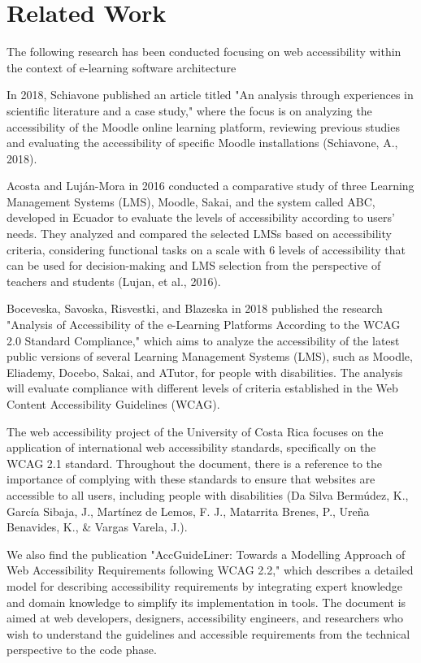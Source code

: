 \documentclass{IEEEtran}
\begin{document}
\section{Related Work}
The following research has been conducted focusing on web accessibility within the context of e-learning software architecture

In 2018, \cite{Schiavone2018}Schiavone published an article titled "An analysis through experiences in scientific literature and a case study," where the focus is on analyzing the accessibility of the Moodle online learning platform, reviewing previous studies and evaluating the accessibility of specific Moodle installations (Schiavone, A., 2018).

\cite{Acosta2016}Acosta and Luján-Mora in 2016 conducted a comparative study of three Learning Management Systems (LMS), Moodle, Sakai, and the system called ABC, developed in Ecuador to evaluate the levels of accessibility according to users' needs. They analyzed and compared the selected LMSs based on accessibility criteria, considering functional tasks on a scale with 6 levels of accessibility that can be used for decision-making and LMS selection from the perspective of teachers and students (Lujan, et al., 2016).

\cite{Bocevska2018}Boceveska, Savoska, Risvestki, and Blazeska in 2018 published the research "Analysis of Accessibility of the e-Learning Platforms According to the WCAG 2.0 Standard Compliance," which aims to analyze the accessibility of the latest public versions of several Learning Management Systems (LMS), such as Moodle, Eliademy, Docebo, Sakai, and ATutor, for people with disabilities. The analysis will evaluate compliance with different levels of criteria established in the Web Content Accessibility Guidelines (WCAG).

The web accessibility project of the University of Costa Rica focuses on the application of international web accessibility standards, specifically on the WCAG 2.1 standard. Throughout the document, there is a reference to the importance of complying with these standards to ensure that websites are accessible to all users, including people with disabilities \cite{DaSilva}(Da Silva Bermúdez, K., García Sibaja, J., Martínez de Lemos, F. J., Matarrita Brenes, P., Ureña Benavides, K., \& Vargas Varela, J.).

We also find the publication "AccGuideLiner: Towards a Modelling Approach of Web Accessibility Requirements following WCAG 2.2," which describes a detailed model for describing accessibility requirements by integrating expert knowledge and domain knowledge to simplify its implementation in tools. The document is aimed at web developers, designers, accessibility engineers, and researchers who wish to understand the guidelines and accessible requirements from the technical perspective to the code phase.
\end{document}
